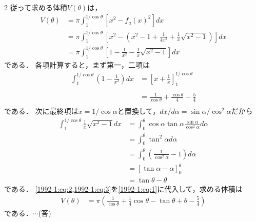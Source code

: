 \documentclass[../../../../main.tex]{subfiles}
\begin{document}
\begin{multicols}{2}
    従って求める体積$V(\theta)$は，
    \begin{align}
        V(\theta)
         & = \pi \int_1^{1/\cos\theta} \left[x^2 - f_a(x)^2\right] dx                                                       \\
         & = \pi \int_1^{1/\cos\theta} \left[x^2 - \left(x^2-1 + \frac{1}{4x^2} + \frac{1}{x}\sqrt{x^2-1}\right)\right]  dx \\
         & = \pi \int_1^{1/\cos\theta} \left[1 - \frac{1}{x^2} - \frac{1}{x}\sqrt{x^2-1}\right]  dx \label{1992-1:eq:1}
    \end{align}
    である．
    各項計算すると，まず第一，二項は
    \begin{align}
        \int_1^{1/\cos\theta} \left(1-\frac{1}{x^2}\right)dx
         & = \left[x + \frac{1}{x}\right]_{1}^{1/\cos\theta}                              \\                                                                          \\
         & = \frac{1}{\cos\theta} + \frac{\cos\theta}{4} - \frac{5}{4}\label{1992-1:eq:2} \\
    \end{align}
    である．
    次に最終項は$x=1/\cos\alpha$と置換して，$dx/d\alpha = \sin\alpha/\cos^2\alpha$だから
    \begin{align}
        \int_1^{1/\cos\theta} \frac{1}{x}\sqrt{x^2-1} dx
         & = \int_0^{\theta} \cos\alpha\tan\alpha \frac{\sin\alpha}{\cos^2\alpha}d\alpha \\
         & = \int_0^{\theta} \tan^2\alpha d\alpha                                        \\
         & = \int_0^{\theta} \left(\frac{1}{\cos^2\alpha}-1\right) d\alpha               \\
         & = \left[\tan\alpha-\alpha\right]_0^{\theta}                                   \\
         & = \tan\theta - \theta \label{1992-1:eq:3}
    \end{align}
    である．
    \cref{1992-1:eq:2,1992-1:eq:3}を\cref{1992-1:eq:1}に代入して，求める体積は
    \begin{align*}
        V(\theta)
         & = \pi \left( \frac{1}{\cos\theta} + \frac{1}{4}\cos\theta - \tan\theta + \theta - \frac{5}{4} \right)
    \end{align*}
    である．$\cdots$(答)


\end{multicols}
\end{document}
